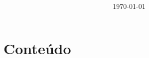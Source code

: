 \documentclass[12pt]{article}
\title{\bfseries\color{Emph}\mytitle}
\author{\myauthor}
\date{\today}
\begin{document}


\maketitle



\renewcommand{\contentsname}{} %

\section*{Conteúdo}
\begin{multicols}{2} \tableofcontents \end{multicols}


\restoregeometry
\end{document}
